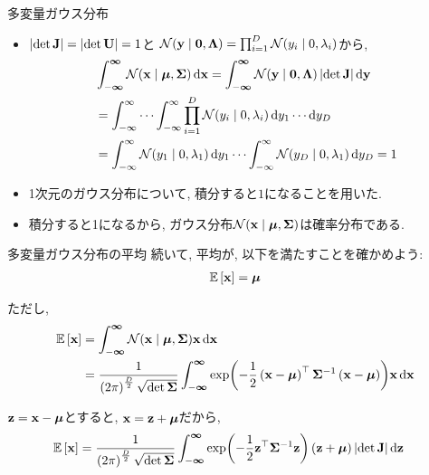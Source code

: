 \documentclass[dvipdfmx,notheorems,t]{beamer}
\begin{document}
\begin{frame}{多変量ガウス分布}
\begin{itemize}
  \item $\left| \det \vb{J} \right| = \left| \det \vb{U} \right| = 1$と
  $\mathcal{N}(\vb{y} \mid \vb{0}, \vb{\Lambda}) = \prod_{i = 1}^D \mathcal{N}(y_i \mid 0, \lambda_i)$から,
  \begin{align*}
    & \int_{-\boldsymbol{\infty}}^{\boldsymbol{\infty}} \mathcal{N}(\vb{x} \mid \vb*{\mu}, \vb{\Sigma}) \dd{\vb{x}}
    = \int_{-\boldsymbol{\infty}}^{\boldsymbol{\infty}} \mathcal{N}(\vb{y} \mid \vb{0}, \vb{\Lambda})
      \left| \det \vb{J} \right| \dd{\vb{y}} \\
    &= \int_{-\infty}^\infty \cdots \int_{-\infty}^\infty
      \prod_{i = 1}^D \mathcal{N}(y_i \mid 0, \lambda_i) \dd{y_1} \cdots \dd{y_D} \\
    &= \int_{-\infty}^\infty \mathcal{N}(y_1 \mid 0, \lambda_1) \dd{y_1} \cdots
      \int_{-\infty}^\infty \mathcal{N}(y_D \mid 0, \lambda_1) \dd{y_D} = 1
  \end{align*}
  \item 1次元のガウス分布について, 積分すると$1$になることを用いた.
  \item 積分すると1になるから, ガウス分布$\mathcal{N}(\vb{x} \mid \vb*{\mu}, \vb{\Sigma})$は確率分布である.
\end{itemize}
\end{frame}

\begin{frame}{多変量ガウス分布の平均}
続いて, 平均が, 以下を満たすことを確かめよう:
\begin{align*}
  \operatorname{\mathbb{E}} \left[ \vb{x} \right] = \vb*{\mu}
\end{align*}

ただし,
\begin{align*}
  \operatorname{\mathbb{E}} \left[ \vb{x} \right] &= \int_{-\boldsymbol{\infty}}^{\boldsymbol{\infty}}
    \mathcal{N}(\vb{x} \mid \vb*{\mu}, \vb{\Sigma}) \vb{x} \dd{\vb{x}} \\
    &= \frac{1}{\left( 2\pi \right)^\frac{D}{2} \sqrt{\det \vb{\Sigma}}}
      \int_{-\boldsymbol{\infty}}^{\boldsymbol{\infty}}
      \exp(-\frac{1}{2} \left( \vb{x} - \vb*{\mu} \right)^\top \vb{\Sigma}^{-1}
      \left( \vb{x} - \vb*{\mu} \right)) \vb{x} \dd{\vb{x}}
\end{align*}

$\vb{z} = \vb{x} - \vb*{\mu}$とすると, $\vb{x} = \vb{z} + \vb*{\mu}$だから,
\begin{align*}
  \operatorname{\mathbb{E}} \left[ \vb{x} \right] &= \frac{1}{\left( 2\pi \right)^\frac{D}{2} \sqrt{\det \vb{\Sigma}}}
    \int_{-\boldsymbol{\infty}}^{\boldsymbol{\infty}}
    \exp(-\frac{1}{2} \vb{z}^\top \vb{\Sigma}^{-1} \vb{z}) \left( \vb{z} + \vb*{\mu} \right)
    \left| \det \vb{J} \right| \dd{\vb{z}}
\end{align*}
\end{frame}
\end{document}
